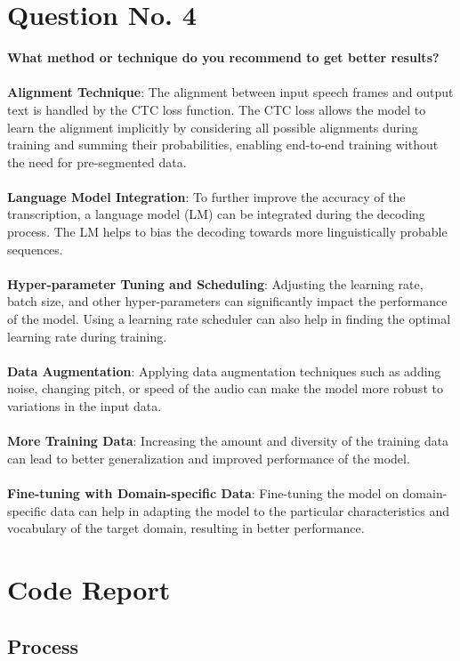 \documentclass{article}
\begin{document}
\section{Question No. 4}
\textbf{What method or technique do you recommend to get better results?}\\\\
\textbf{Alignment Technique}: The alignment between input speech frames and output text is handled by the CTC loss function. The CTC loss allows the model to learn the alignment implicitly by considering all possible alignments during training and summing their probabilities, enabling end-to-end training without the need for pre-segmented data.\\\\
\textbf{Language Model Integration}: To further improve the accuracy of the transcription, a language model (LM) can be integrated during the decoding process. The LM helps to bias the decoding towards more linguistically probable sequences.\\\\
\textbf{Hyper-parameter Tuning and Scheduling}: Adjusting the learning rate, batch size, and other hyper-parameters can significantly impact the performance of the model. Using a learning rate scheduler can also help in finding the optimal learning rate during training.\\\\
\textbf{Data Augmentation}: Applying data augmentation techniques such as adding noise, changing pitch, or speed of the audio can make the model more robust to variations in the input data.\\\\
\textbf{More Training Data}: Increasing the amount and diversity of the training data can lead to better generalization and improved performance of the model.\\\\
\textbf{Fine-tuning with Domain-specific Data}: Fine-tuning the model on domain-specific data can help in adapting the model to the particular characteristics and vocabulary of the target domain, resulting in better performance.


\pagebreak

\section{Code Report}

\subsection{Process}
\end{document}
